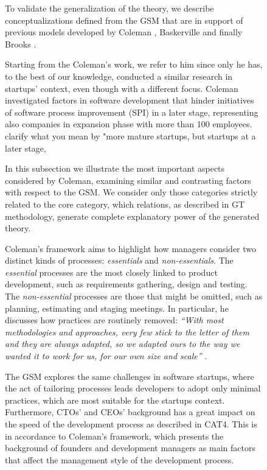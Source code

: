 \documentclass[12pt,journal,compsoc]{../sty/IEEEtran}
\begin{document}
\begin{table}[!t]
\begin{figure}[!t]
\begin{compactitem}
To validate the generalization of the theory, we describe conceptualizations
defined from the GSM that are in support of previous models developed by
Coleman \cite{Coleman2007,Coleman2008a, Coleman2008}, Baskerville
\cite{Internet} and finally Brooks \cite{BrooksJr1987}.

Starting from the Coleman's work, we refer to him since only he has,  to the
best of our knowledge, conducted a similar research in startups' context, even
though with a different focus. Coleman investigated factors in software
development that hinder initiatives of software process improvement (SPI) in a
later stage, representing also companies in expansion phase with more than 100
employees. %
clarify what you mean by "more mature  %
startups, but startups at a later stage,  %

In this subsection we illustrate the most important aspects considered by
Coleman, examining similar and contrasting factors with respect to the GSM. We
consider only those categories strictly related to the core category, which
relations, as described in GT methodology, generate complete explanatory power
of the generated theory.

Coleman's framework aims to highlight how managers consider two distinct kinds
of processes: \textit{essentials} and \textit{non-essentials}. The
\textit{essential} processes are the most closely linked to product development,
such as requirements gathering, design and testing. The \textit{non-essential}
processes are those that might be omitted, such as planning, estimating and
staging meetings. In particular, he discusses how practices are routinely
removed: \textit{``With most methodologies and approaches, very few stick to the
letter of them and they are always adapted, so we adapted ours to the way we
wanted it to work for us, for our own size and scale''} \cite{Coleman2008}.

The GSM explores the same challenges in software startups, where the act of
tailoring processes leads developers to adopt only minimal practices, which are
most suitable for the startups context. Furthermore, CTOs' and CEOs' background
has a great impact on the speed of the development process as described in CAT4.
This is in accordance to Coleman's framework, which presents the background of
founders and development managers as main factors that affect the management
style of the development process.


\end{compactitem}
\end{figure}
\end{table}
\end{document}
